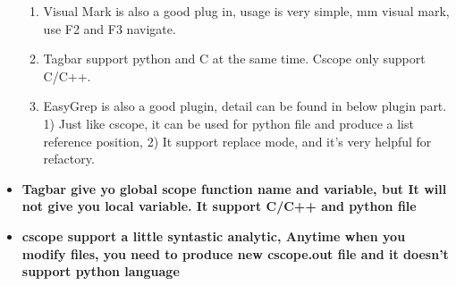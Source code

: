\documentclass[a4paper,11pt,twoside]{book}
\begin{document}
\begin{itemize}
\begin{enumerate}
\item Visual Mark is also a good plug in, usage is very simple, mm visual mark, use F2 and F3 navigate.

\item Tagbar support python and C at the same time. Cscope only support C/C++.

\item EasyGrep is also a good plugin, detail can be found in below plugin part. 1) Just like cscope, it can be used for python file and produce a list reference position, 2) It support replace mode, and it's very helpful for refactory.

\end{enumerate}

\item \textbf{Tagbar give yo global scope function name and variable, but It will not give you local variable. It support C/C++ and python file}

\item \textbf{cscope support a little syntastic analytic, Anytime when you modify files, you need to produce new cscope.out file and it doesn't support python language}

\end{itemize}
\end{document}
